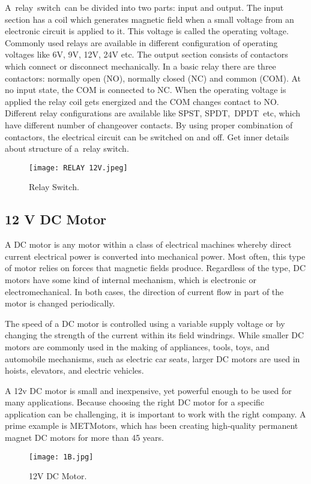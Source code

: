 A relay switch can be divided into two parts: input and output. The input section
has a coil which generates magnetic field when a small voltage from an electronic
circuit is applied to it. This voltage is called the operating voltage. Commonly used
relays are available in different configuration of operating voltages like 6V, 9V,
12V, 24V etc. The output section consists of contactors which connect or
disconnect mechanically. In a basic relay there are three contactors: normally
open (NO), normally closed (NC) and common (COM). At no input state, the COM
is connected to NC. When the operating voltage is applied the relay coil gets
energized and the COM changes contact to NO. Different relay configurations are
available like SPST, SPDT, DPDT etc, which have different number of changeover
contacts. By using proper combination of contactors, the electrical circuit can be
switched on and off. Get inner details about structure of a relay switch.
\begin{figure}[h]
	\centering
	\texttt{[image: RELAY 12V.jpeg]}
	\caption{Relay Switch.}
\end{figure}


\pagebreak\subsection{12 V DC Motor}
A DC motor is any motor within a class of electrical machines whereby direct current electrical power is converted into mechanical power. Most often, this type of motor relies on forces that magnetic fields produce. Regardless of the type, DC motors have some kind of internal mechanism, which is electronic or electromechanical. In both cases, the direction of current flow in part of the motor is changed periodically.\vspace{.3cm}

The speed of a DC motor is controlled using a variable supply voltage or by changing the strength of the current within its field windrings. While smaller DC motors are commonly used in the making of appliances, tools, toys, and automobile mechanisms, such as electric car seats, larger DC motors are used in hoists, elevators, and electric vehicles.\vspace{.3 cm}

A 12v DC motor is small and inexpensive, yet powerful enough to be used for many applications. Because choosing the right DC motor for a specific application can be challenging, it is important to work with the right company. A prime example is METMotors, which has been creating high-quality permanent magnet DC motors for more than 45 years.\vspace{.3cm}
\begin{figure}[h]
	\centering
	\texttt{[image: 1B.jpg]}
	\caption{12V DC Motor.}
\end{figure}


